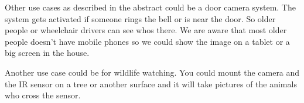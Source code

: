 Other use cases as described in the abstract could be a door camera system. The system gets activated if someone rings the bell or is near the door. So older people or wheelchair drivers can see whos there. We are aware that most older people doesn’t have mobile phones so we could show the image on a tablet or a big screen in the house.

Another use case could be for wildlife watching. You could mount the camera and the IR sensor on a tree or another surface and it will take pictures of the animals who cross the sensor.


